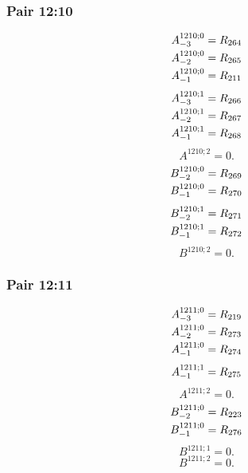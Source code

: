 \documentclass[11pt,a4paper]{article}
\begin{document}
\subsubsection{Pair 12:10}
\begin{equation}
\shortstack[l]{$\displaystyle A^{1210;0}_{-3}=R_{264}$\\
$\displaystyle A^{1210;0}_{-2}=R_{265}$\\
$\displaystyle A^{1210;0}_{-1}=R_{211}$}
\label{eq:cat-map-288}
\end{equation}
\begin{equation}
\shortstack[l]{$\displaystyle A^{1210;1}_{-3}=R_{266}$\\
$\displaystyle A^{1210;1}_{-2}=R_{267}$\\
$\displaystyle A^{1210;1}_{-1}=R_{268}$}
\label{eq:cat-map-289}
\end{equation}
\begin{equation}
A^{1210;2}=0.
\label{eq:cat-map-290}
\end{equation}
\begin{equation}
\shortstack[l]{$\displaystyle B^{1210;0}_{-2}=R_{269}$\\
$\displaystyle B^{1210;0}_{-1}=R_{270}$}
\label{eq:cat-map-291}
\end{equation}
\begin{equation}
\shortstack[l]{$\displaystyle B^{1210;1}_{-2}=R_{271}$\\
$\displaystyle B^{1210;1}_{-1}=R_{272}$}
\label{eq:cat-map-292}
\end{equation}
\begin{equation}
B^{1210;2}=0.
\label{eq:cat-map-293}
\end{equation}
\subsubsection{Pair 12:11}
\begin{equation}
\shortstack[l]{$\displaystyle A^{1211;0}_{-3}=R_{219}$\\
$\displaystyle A^{1211;0}_{-2}=R_{273}$\\
$\displaystyle A^{1211;0}_{-1}=R_{274}$}
\label{eq:cat-map-294}
\end{equation}
\begin{equation}
\shortstack[l]{$\displaystyle A^{1211;1}_{-1}=R_{275}$}
\label{eq:cat-map-295}
\end{equation}
\begin{equation}
A^{1211;2}=0.
\label{eq:cat-map-296}
\end{equation}
\begin{equation}
\shortstack[l]{$\displaystyle B^{1211;0}_{-2}=R_{223}$\\
$\displaystyle B^{1211;0}_{-1}=R_{276}$}
\label{eq:cat-map-297}
\end{equation}
\begin{equation}
B^{1211;1}=0.
\label{eq:cat-map-298}
\end{equation}
\begin{equation}
B^{1211;2}=0.
\label{eq:cat-map-299}
\end{equation}
\end{document}

